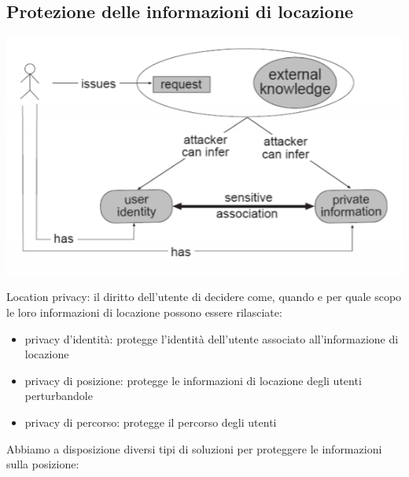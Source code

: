 \subsection{Protezione delle informazioni di locazione}
\begin{center}
    \includegraphics[scale=0.8]{img/locprivacy.png}
\end{center}
Location privacy: il diritto dell'utente di decidere come, quando e per quale scopo le loro informazioni di locazione possono essere rilasciate:
\begin{itemize}
    \item privacy d'identità: protegge l'identità dell'utente associato all'informazione di locazione
    \item privacy di posizione: protegge le informazioni di locazione degli utenti perturbandole
    \item privacy di percorso: protegge il percorso degli utenti
\end{itemize}
Abbiamo a disposizione diversi tipi di soluzioni per proteggere le informazioni sulla posizione:

